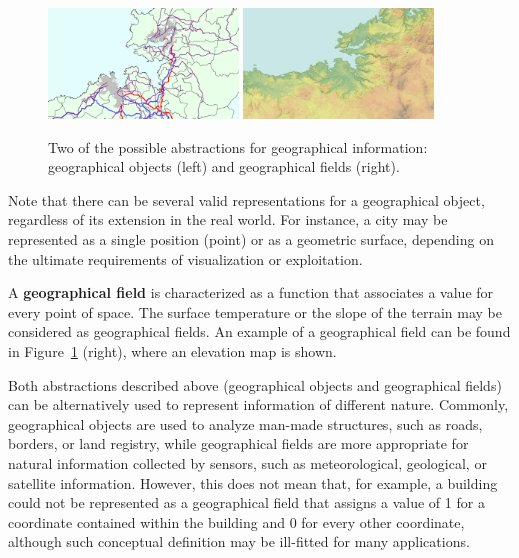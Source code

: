     \begin{figure}[ht]
		\begin{center}
			{\includegraphics[width=0.45\textwidth]{figures/geo_object.png}}
			{\includegraphics[width=0.45\textwidth]{figures/geo_field.png}}
		\end{center}
		\caption{Two of the possible abstractions for geographical information: geographical objects (left) and geographical fields (right).}
		\label{fig:gis:concept}
	\end{figure}
    
    Note that there can be several valid representations for a geographical object, regardless of its extension in the real world. For instance, a city may be represented as a single position (point) or as a geometric surface, depending on the ultimate requirements of visualization or exploitation.
    
    A \textbf{geographical field} is characterized as a function that associates a value for every point of space. The surface temperature or the slope of the terrain may be considered as geographical fields. An example of a geographical field can be found in Figure~\ref{fig:gis:concept} (right), where an elevation map is shown.
    
    Both abstractions described above (geographical objects and geographical fields) can be alternatively used to represent information of different nature. Commonly, geographical objects are used to analyze \mbox{man-made} structures, such as roads, borders, or land registry, while geographical fields are more appropriate for natural information collected by sensors, such as meteorological, geological, or satellite information. However, this does not mean that, for example, a building could not be represented as a geographical field that assigns a value of 1 for a coordinate contained within the building and 0 for every other coordinate, although such conceptual definition may be \mbox{ill-fitted} for many applications.

